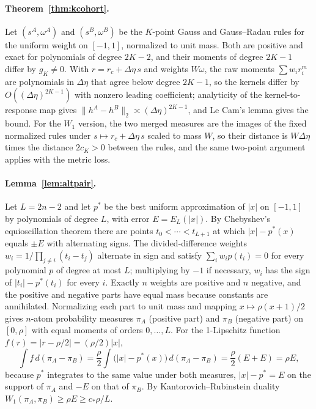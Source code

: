 \documentclass[12pt]{article}
\theoremstyle{definition}
\theoremstyle{remark}
\begin{document}
\paragraph{Theorem~\ref{thm:kcohort}.} Let $(s^A,\omega^A)$ and $(s^B,\omega^B)$ be the $K$-point Gauss and Gauss--Radau rules for the uniform weight on $[-1,1]$, normalized to unit mass. Both are positive and exact for polynomials of degree $2K-2$, and their moments of degree $2K-1$ differ by $g_K\neq0$. With $r=r_c+\Delta\eta\,s$ and weights $W\omega$, the raw moments $\sum w_ir_i^m$ are polynomials in $\Delta\eta$ that agree below degree $2K-1$, so the kernels differ by $O((\Delta\eta)^{2K-1})$ with nonzero leading coefficient; analyticity of the kernel-to-response map gives $\|h^A-h^B\|_2\asymp(\Delta\eta)^{2K-1}$, and Le Cam's lemma gives the bound. For the $W_1$ version, the two merged measures are the images of the fixed normalized rules under $s\mapsto r_c+\Delta\eta\,s$ scaled to mass $W$, so their distance is $W\Delta\eta$ times the distance $2c_K>0$ between the rules, and the same two-point argument applies with the metric loss.

\paragraph{Lemma~\ref{lem:altpair}.} Let $L=2n-2$ and let $p^*$ be the best uniform approximation of $|x|$ on $[-1,1]$ by polynomials of degree $L$, with error $E=E_L(|x|)$. By Chebyshev's equioscillation theorem \citep{rivlin1981} there are points $t_0<\cdots<t_{L+1}$ at which $|x|-p^*(x)$ equals $\pm E$ with alternating signs. The divided-difference weights $w_i=1/\prod_{j\ne i}(t_i-t_j)$ alternate in sign and satisfy $\sum_iw_ip(t_i)=0$ for every polynomial $p$ of degree at most $L$; multiplying by $-1$ if necessary, $w_i$ has the sign of $|t_i|-p^*(t_i)$ for every $i$. Exactly $n$ weights are positive and $n$ negative, and the positive and negative parts have equal mass because constants are annihilated. Normalizing each part to unit mass and mapping $x\mapsto\rho(x+1)/2$ gives $n$-atom probability measures $\pi_A$ (positive part) and $\pi_B$ (negative part) on $[0,\rho]$ with equal moments of orders $0,\ldots,L$. For the 1-Lipschitz function $f(r)=|r-\rho/2|=(\rho/2)|x|$,
\[
\int f\,d(\pi_A-\pi_B)=\frac\rho2\int\bigl(|x|-p^*(x)\bigr)\,d(\pi_A-\pi_B)=\frac\rho2(E+E)=\rho E ,
\]
because $p^*$ integrates to the same value under both measures, $|x|-p^*=E$ on the support of $\pi_A$ and $-E$ on that of $\pi_B$. By Kantorovich--Rubinstein duality $W_1(\pi_A,\pi_B)\ge\rho E\ge c_*\rho/L$.
\end{document}
